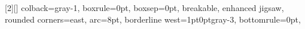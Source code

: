 [2][]{%
    colback=gray-1,
    boxrule=0pt,
    boxsep=0pt,
    breakable,
    enhanced jigsaw,
    rounded corners=east,
    arc=8pt,
    borderline west={1pt}{0pt}{gray-3},
    bottomrule=0pt,
}

